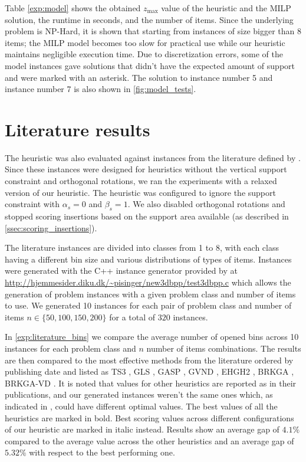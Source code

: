 Table \ref{exp:model} shows the obtained $z_{\text{max}}$ value of the heuristic and the MILP solution, the runtime in seconds, and the number of items.
Since the underlying problem is NP-Hard, it is shown that starting from instances of size bigger than 8 items; the MILP model becomes too slow for practical use while our heuristic maintains negligible execution time.
Due to discretization errors, some of the model instances gave solutions that didn't have the expected amount of support and were marked with an asterisk.
The solution to instance number 5 and instance number 7 is also shown in \cref{fig:model_tests}.
\label{exp:model_tests}



\clearpage
\section{Literature results}
The heuristic was also evaluated against instances from the literature defined by \citep{martello2000three}.
Since these instances were designed for heuristics without the vertical support constraint and orthogonal rotations, we ran the experiments with a relaxed version of our heuristic.
The heuristic was configured to ignore the support constraint with $\alpha_s = 0$ and $\beta_s = 1$. We also disabled orthogonal rotations and stopped scoring insertions based on the support area available (as described in \cref{ssec:scoring_insertions}).

\label{def:class1_instances}
The literature instances are divided into classes from 1 to 8, with each class having a different bin size and various distributions of types of items.
Instances were generated with the C++ instance generator provided by \citep{martello2000three} at \url{http://hjemmesider.diku.dk/~pisinger/new3dbpp/test3dbpp.c} which allows the generation of problem instances with a given problem class and number of items to use.
We generated 10 instances for each pair of problem class and number of items $n \in \{50, 100, 150, 200\}$ for a total of $320$ instances.

In \cref{exp:literature_bins} we compare the average number of opened bins across 10 instances for each problem class and $n$ number of items combinations.
The results are then compared to the most effective methods from the literature ordered by publishing date and listed as TS3 \citep{lodi2002heuristic}, GLS \citep{faroe2003guided}, GASP \citep{crainic2009ts2pack}, GVND \citep{parreno2010hybrid}, EHGH2 \citep{hifi2014hybrid}, BRKGA \citep{gonccalves2013biased}, BRKGA-VD \citep{zudio2018brkga}.
It is noted that values for other heuristics are reported as in their publications, and our generated instances weren't the same ones which, as indicated in \citep{hifi2014hybrid}, could have different optimal values.
The best values of all the heuristics are marked in bold. Best scoring values across different configurations of our heuristic are marked in italic instead.
Results show an average gap of $4.1\%$ compared to the average value across the other heuristics and an average gap of $5.32\%$ with respect to the best performing one.

